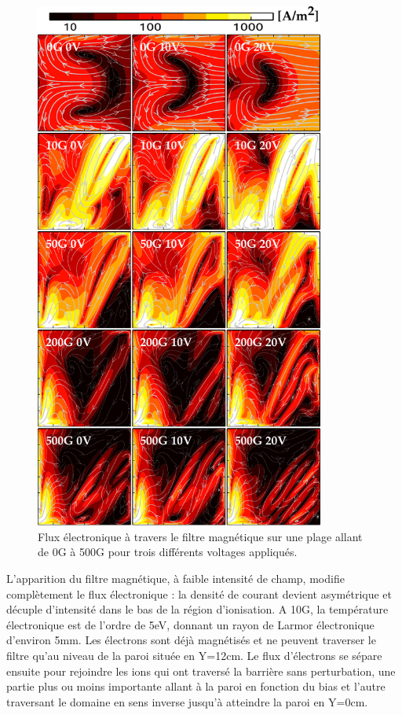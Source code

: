 \begin{refsection}
 \begin{figure}[htbp]
	\centering
	\includegraphics[width=0.85\textwidth]{figures/4-pegasesfluxElectronique.pdf}
	{\caption{Flux électronique à travers le filtre magnétique sur une plage
	allant de 0G à 500G pour trois différents voltages appliqués.}
	\label{4-pegasesfluxElectronique}}
	\end{figure}
	
L'apparition du filtre magnétique, à faible intensité de champ, modifie
complètement le flux électronique : la densité de courant devient asymétrique et
décuple d'intensité dans le bas de la région d'ionisation. A 10G, la
température électronique est de l'ordre de 5eV, donnant un rayon de Larmor
électronique d'environ 5mm. Les électrons sont déjà magnétisés et ne peuvent
traverser le filtre qu'au niveau de la paroi située en Y=12cm. Le flux
d'électrons se sépare ensuite pour rejoindre les ions qui ont traversé la
barrière sans perturbation, une partie plus ou moins importante allant à la
paroi en fonction du bias et l'autre traversant le domaine en sens inverse
jusqu'à atteindre la paroi en Y=0cm.


\end{refsection}
